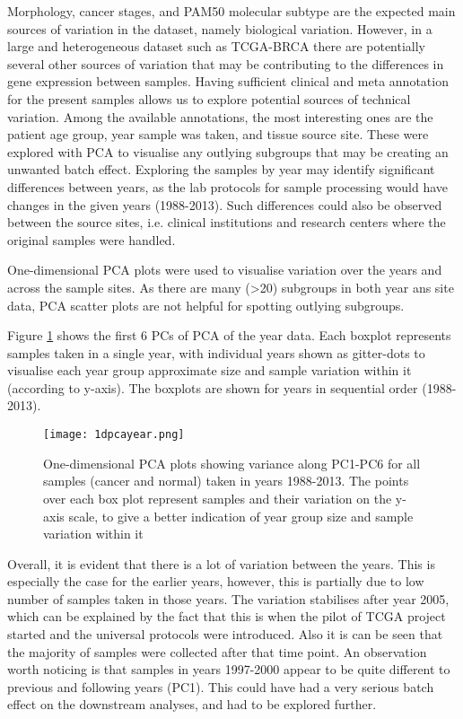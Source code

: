     Morphology, cancer stages, and PAM50 molecular subtype are the expected main sources of variation in the dataset, namely biological variation. However, in a large and heterogeneous dataset such as TCGA-BRCA there are potentially several other sources of variation that may be contributing to the differences in gene expression between samples. Having sufficient clinical and meta annotation for the present samples allows us to explore potential sources of technical variation.
    Among the available annotations, the most interesting ones are the patient age group, year sample was taken, and tissue source site. These were explored with PCA to visualise any outlying subgroups that may be creating an unwanted batch effect.
    Exploring the samples by year may identify significant differences between years, as the lab protocols for sample processing would have changes in the given years (1988-2013). Such differences could also be observed between the source sites, i.e. clinical institutions and research centers where the original samples were handled. 

    One-dimensional PCA plots were used to visualise variation over the years and across the sample sites. As there are many (>20) subgroups in both year ans site data, PCA scatter plots are not helpful for spotting outlying subgroups. 
    
    Figure \ref{fig:1dpcayear} shows the first 6 PCs of PCA of the year data. Each boxplot represents samples taken in a single year, with individual years shown as gitter-dots to visualise each year group approximate size and sample variation within it (according to y-axis). The boxplots are shown for years in sequential order (1988-2013). 
        
            \begin{figure}[!h]
            \centering
            \texttt{[image: 1dpcayear.png]}
            \caption{One-dimensional PCA plots showing variance along PC1-PC6 for all samples (cancer and normal) taken in years 1988-2013. The points over each box plot represent samples and their variation on the y-axis scale, to give a better indication of year group size and sample variation within it}
            \label{fig:1dpcayear}
            \end{figure}
    
    
    Overall, it is evident that there is a lot of variation between the years. This is especially the case for the earlier years, however, this is partially due to low number of samples taken in those years.  The variation stabilises after year 2005, which can be explained by the fact that this is when the pilot of TCGA project started and the universal protocols were introduced. Also it is can be seen that the majority of samples were collected after that time point. An observation worth noticing is that samples in years 1997-2000 appear to be quite different to previous and following years (PC1). This could have had a very serious batch effect on the downstream analyses, and had to be explored further.\\
    
